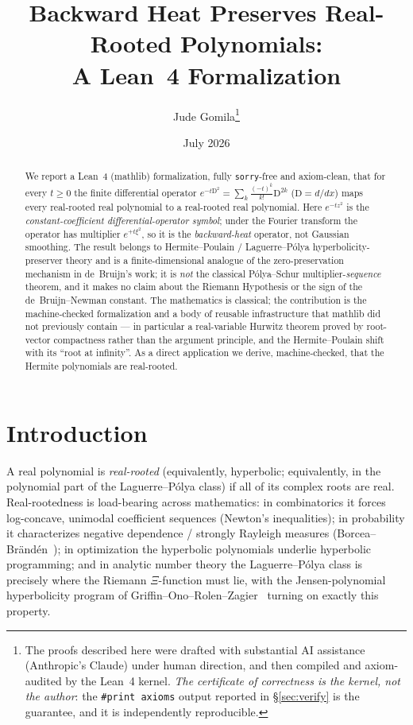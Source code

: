 \documentclass[11pt]{article}
\title{\bf Backward Heat Preserves Real-Rooted Polynomials:\\ A Lean~4 Formalization}
\author{Jude Gomila\thanks{The proofs described here were drafted with substantial AI
assistance (Anthropic's Claude) under human direction, and then compiled and axiom-audited by the
Lean~4 kernel. \emph{The certificate of correctness is the kernel, not the author}: the
\texttt{\#print axioms} output reported in \S\ref{sec:verify} is the guarantee, and it is
independently reproducible.}}
\date{July 2026}
\theoremstyle{definition}
\theoremstyle{remark}
\newcommand{\D}{\mathrm{D}}
\begin{document}
\maketitle
\sloppy

\begin{abstract}
We report a Lean~4 (mathlib) formalization, fully \texttt{sorry}-free and axiom-clean, that for every
$t \ge 0$ the finite differential operator $e^{-t\D^2} = \sum_k \frac{(-t)^k}{k!}\D^{2k}$ ($\D=d/dx$)
maps every real-rooted real polynomial to a real-rooted real polynomial. Here $e^{-t z^2}$ is the
\emph{constant-coefficient differential-operator symbol}; under the Fourier transform the operator
has multiplier $e^{+t\xi^2}$, so it is the \emph{backward-heat} operator, not Gaussian smoothing.
The result belongs to Hermite--Poulain / Laguerre--P\'olya hyperbolicity-preserver theory and is a
finite-dimensional analogue of the zero-preservation mechanism in de~Bruijn's work; it is
\emph{not} the classical P\'olya--Schur multiplier-\emph{sequence} theorem, and it makes no claim
about the Riemann Hypothesis or the sign of the de~Bruijn--Newman constant. The mathematics is
classical; the contribution is the machine-checked formalization and a body of reusable
infrastructure that mathlib did not previously contain --- in particular a real-variable Hurwitz
theorem proved by root-vector compactness rather than the argument principle, and the
Hermite--Poulain shift with its ``root at infinity''. As a direct application we derive,
machine-checked, that the Hermite polynomials are real-rooted.
\end{abstract}

\section{Introduction}

A real polynomial is \emph{real-rooted} (equivalently, hyperbolic; equivalently, in the polynomial
part of the Laguerre--P\'olya class) if all of its complex roots are real. Real-rootedness is
load-bearing across mathematics: in combinatorics it forces log-concave, unimodal coefficient
sequences (Newton's inequalities); in probability it characterizes negative dependence / strongly
Rayleigh measures (Borcea--Br\"and\'en~\cite{borcea-branden}); in optimization the hyperbolic
polynomials underlie hyperbolic programming; and in analytic number theory the Laguerre--P\'olya
class is precisely where the Riemann $\Xi$-function must lie, with the Jensen-polynomial
hyperbolicity program of Griffin--Ono--Rolen--Zagier~\cite{gorz} turning on exactly this property.
\end{document}
